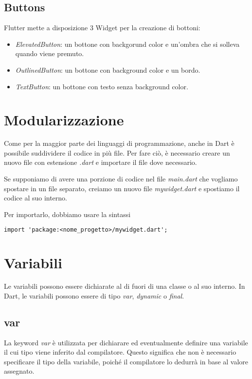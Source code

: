\documentclass[12pt]{article}
\begin{document}
\subsection{Buttons}
Flutter mette a disposizione 3 Widget per la creazione di bottoni:
\begin{itemize}
    \item \textit{ElevatedButton}: un bottone con backgorund color e un'ombra che si solleva quando viene premuto.
    \item \textit{OutlinedButton}: un bottone con background color e un bordo.
    \item \textit{TextButton}: un bottone con testo senza background color.
\end{itemize}





\section{Modularizzazione}
Come per la maggior parte dei linguaggi di programmazione,
anche in Dart è possibile suddividere il codice in più file.
Per fare ciò, è necessario creare un nuovo file con estensione \textit{.dart}
e importare il file dove necessario.

Se supponiamo di avere una porzione di codice nel file
\textit{main.dart} che vogliamo spostare in un file separato,
creiamo un nuovo file \textit{mywidget.dart} e spostiamo il codice
al suo interno.

Per importarlo, dobbiamo usare la sintassi
\begin{highlight}
\begin{verbatim}
import 'package:<nome_progetto>/mywidget.dart';
\end{verbatim}
\end{highlight}


\section{Variabili}
Le variabili possono essere dichiarate al di fuori di una classe o al 
suo interno.
In Dart, le variabili possono essere di tipo \textit{var}, \textit{dynamic} o \textit{final}.

\subsection{var}
La keyword \textit{var} è utilizzata per dichiarare ed 
eventualmente definire una variabile il cui tipo
viene inferito dal compilatore. Questo significa che non è necessario specificare
il tipo della variabile, poiché il compilatore lo dedurrà in base al valore assegnato.
\end{document}
